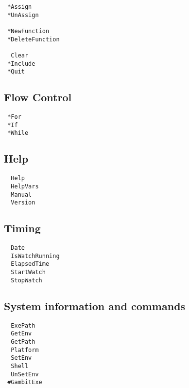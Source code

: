 \begin{multicols}{3}
\begin{verbatim}
 *Assign 
 *UnAssign 

 *NewFunction
 *DeleteFunction

  Clear 
 *Include
 *Quit
\end{verbatim}
\end{multicols}

\subsection{Flow Control}

\begin{multicols}{3}
\begin{verbatim}
 *For
 *If
 *While
\end{verbatim}
\end{multicols}

\subsection{Help}

\begin{multicols}{3}
\begin{verbatim}
  Help 
  HelpVars 
  Manual 
  Version 
\end{verbatim}
\end{multicols}


\subsection{Timing}

\begin{multicols}{3}
\begin{verbatim}
  Date 
  IsWatchRunning 
  ElapsedTime 
  StartWatch 
  StopWatch 
\end{verbatim}
\end{multicols}

\subsection{System information and commands}

\begin{multicols}{3}
\begin{verbatim}
  ExePath 
  GetEnv 
  GetPath 
  Platform 
  SetEnv 
  Shell 
  UnSetEnv 
 #GambitExe 
\end{verbatim}
\end{multicols}

